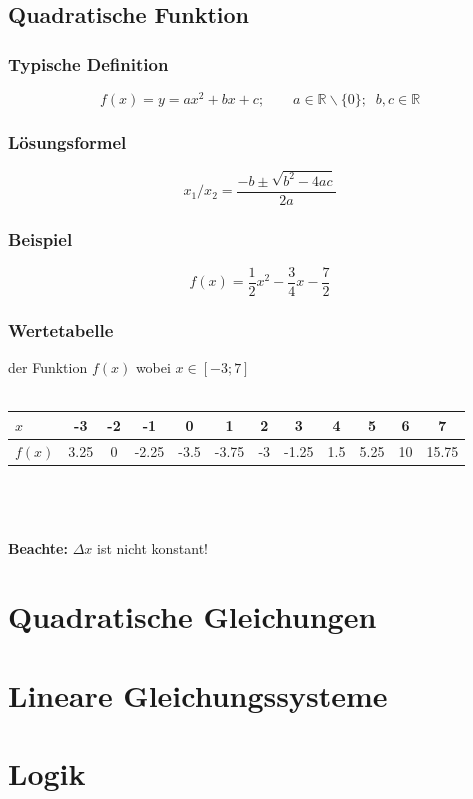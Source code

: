 \documentclass[12pt,a4paper]{scrbook}
\begin{document}
\section{Quadratische Funktion}
\subsection{Typische Definition}
\[f(x) = y = ax^2 + bx + c; \quad\quad a \in \mathbb{R}\backslash\{0\}; \;\; b, c \in \mathbb{R}\]
\subsection{Lösungsformel}
\[x_1 / x_2 = \frac{-b \pm \sqrt{b^2-4ac}}{2a} \]
\subsection{Beispiel}
\[f(x) = \frac{1}{2}x^2 - \frac{3}{4}x - \frac{7}{2}\]

\subsection{Wertetabelle} der Funktion $f(x)$ wobei $x \in [-3; 7]$\\\\
\begin{tabular}{l||c|c|c|c|c|c|c|c|c|c|c}
$x$ & -3 & -2 & -1 & 0 & 1 & 2 & 3 & 4 & 5 & 6 & 7\\
\hline
$f(x)$ & 3.25 & 0 & -2.25 & -3.5 & -3.75 & -3 & -1.25 & 1.5 & 5.25 & 10 & 15.75\\
\end{tabular}\\\\\\
\textbf{Beachte:} $\Delta x$ ist nicht konstant!\\


\chapter{Quadratische Gleichungen}
\label{quadratische_gleichungen}


\chapter{Lineare Gleichungssysteme}


\chapter{Logik}
\end{document}
